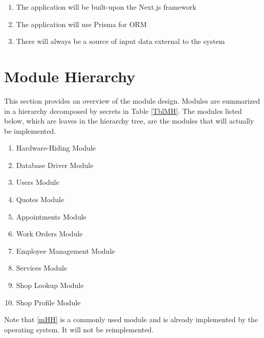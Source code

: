 \documentclass[12pt, titlepage]{article}
\begin{document}
\begin{enumerate}[label=\textbf{UC\arabic*:},ref=UC\arabic*]
	\item \label{ucNextjs} The application will be built-upon the Next.js framework
	\item \label{ucPrisma} The application will use Prisma for ORM
	\item \label{ucInput} There will always be a source of input data external to the system
\end{enumerate}

\section{Module Hierarchy} \label{SecMH}

This section provides an overview of the module design. Modules are summarized in a hierarchy
decomposed by secrets in Table \ref{TblMH}. The modules listed below, which are leaves in the
hierarchy tree, are the modules that will actually be implemented.

\begin{enumerate}[label=\textbf{M\arabic*:},ref=M\arabic*]
	\item \label{mHH} Hardware-Hiding Module
	\item \label{mDBDriver} Database Driver Module
	\item \label{mUsers} Users Module
	\item \label{mQuotes} Quotes Module
	\item \label{mAppointments} Appointments Module
	\item \label{mWorkOrders} Work Orders Module
	\item \label{mEmployeeManagement} Employee Management Module
	\item \label{mServices} Services Module
	\item \label{mShopLookup} Shop Lookup Module
	\item \label{mShopProfile} Shop Profile Module
\end{enumerate}

Note that \ref{mHH} is a commonly used module and is already implemented by the operating system.
It will not be reimplemented.
\end{document}

